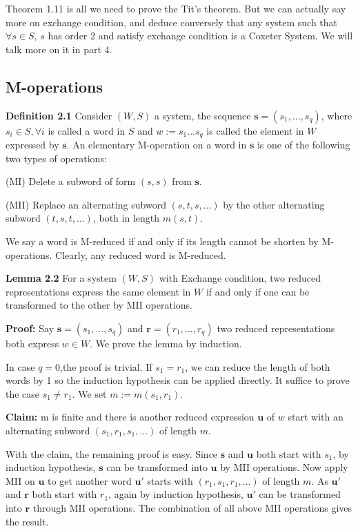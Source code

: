 \documentclass[../main.tex]{subfiles}
\begin{document}
\vspace{\baselineskip}
Theorem 1.11 is all we need to prove the Tit's theorem. But we can actually say more on exchange condition, and deduce conversely that any system such that $\forall s\in S$, $s$ has order 2 and satisfy exchange condition is a Coxeter System. We will talk more on it in part 4.

\subsection{M-operations}
\noindent \textbf{Definition 2.1} Consider $(W,S)$ a system, the sequence $\mathbf{s}=(s_1,...,s_q)$, where $s_i \in S,\forall i$ is called a word in $S$ and $w:=s_1...s_q$ is called the element in $W$ expressed by $\mathbf{s}$. An elementary M-operation on a word in $\mathbf{s}$ is one of the following two types of operations:

(MI) Delete a subword of form $(s,s)$ from $\mathbf{s}$.

(MII) Replace an alternating subword $(s,t,s,...)$ by the other alternating subword $(t,s,t,...)$, both in length $m(s,t)$.

We say a word is M-reduced if and only if its length cannot be shorten by M-operations. Clearly, any reduced word is M-reduced.

\vspace{\baselineskip}
\noindent \textbf{Lemma 2.2} For a system $(W,S)$ with Exchange condition, two reduced representations express the same element in $W$ if and only if one can be transformed to the other by MII operations.

\vspace{0.5\baselineskip} 
\noindent \textbf{Proof:} Say $\mathbf{s}=(s_1,...,s_q)$ and $\mathbf{r}=(r_1,...,r_q)$ two reduced representations both express $w \in W$. We prove the lemma by induction. 

In case $q=0$,the proof is trivial. If $s_1=r_1$, we can reduce the length of both words by 1 so the induction hypothesis can be applied directly. It suffice to prove the case $s_1 \ne r_1$. We set $m:=m(s_1,r_1)$.

\vspace{0.5\baselineskip}
\noindent \textbf{Claim:} m is finite and there is another reduced expression $\mathbf{u}$ of $w$ start with an alternating subword $(s_1,r_1,s_1,...)$ of length $m$.

\vspace{0.5\baselineskip}
With the claim, the remaining proof is easy. Since $\mathbf{s}$ and $\mathbf{u}$ both start with $s_1$, by induction hypothesis, $\mathbf{s}$ can be transformed into $\mathbf{u}$ by MII operations. Now apply MII on $\mathbf{u}$ to get another word $\mathbf{u'}$ starts with $(r_1,s_1,r_1,...)$ of length $m$. As $\mathbf{u'}$ and $\mathbf{r}$ both start with $r_1$, again by induction hypothesis, $\mathbf{u'}$ can be transformed into $\mathbf{r}$ through MII operations. The combination of all above MII operations gives the result. 
\end{document}

